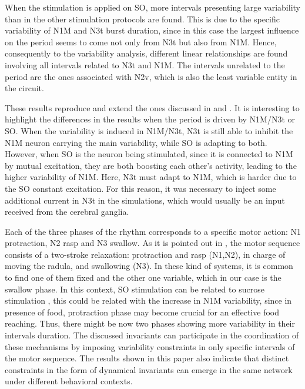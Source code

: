 When the stimulation is applied on SO, more intervals presenting large variability than in the other stimulation protocols are found. This is due to the specific variability of N1M and N3t burst duration, since in this case the largest influence on the period seems to come not only from N3t but also from N1M. Hence, consequently to the variability analysis, different linear relationships are found involving all intervals related to N3t and N1M. The intervals unrelated to the period are the ones associated with N2v, which is also the least variable entity in the circuit. 


These results reproduce and extend the ones discussed in \cite{Vavoulis2007} and \cite{Elliott1991}. It is interesting to highlight the differences in the results when the period is driven by N1M/N3t or SO. When the variability is induced in N1M/N3t, N3t is still able to inhibit the N1M neuron carrying the main variability, while SO is adapting to both. However, when SO is the neuron being stimulated, since it is connected to N1M by mutual excitation, they are both boosting each other's activity, leading to the higher variability of N1M. Here, N3t must adapt to N1M, which is harder due to the SO constant excitation. For this reason, it was necessary to inject some additional current in N3t in the simulations, which would usually be an input received from the cerebral ganglia. 

Each of the three phases of the rhythm corresponds to a specific motor action: N1 protraction, N2 rasp and N3 swallow. As it is pointed out in \cite{Elliott1991}, the motor sequence consists of a two-stroke relaxation: protraction and rasp (N1,N2), in charge of moving the radula, and swallowing (N3). In these kind of systems, it is common to find one of them fixed and the other one variable, which in our case is the swallow phase. In this context, SO stimulation can be related to sucrose stimulation \cite{Benjamin2012,Kemenes1994},
this could be related with the increase in N1M variability, since in presence of food, protraction phase may become crucial for an effective food reaching. Thus, there might be now two phases showing more variability in their intervals duration. The discussed invariants can participate in the coordination of these mechanisms by imposing  variability constraints in only specific intervals of the motor sequence. The results shown in this paper also indicate that distinct constraints in the form of dynamical invariants can emerge in the same network under different behavioral contexts.



